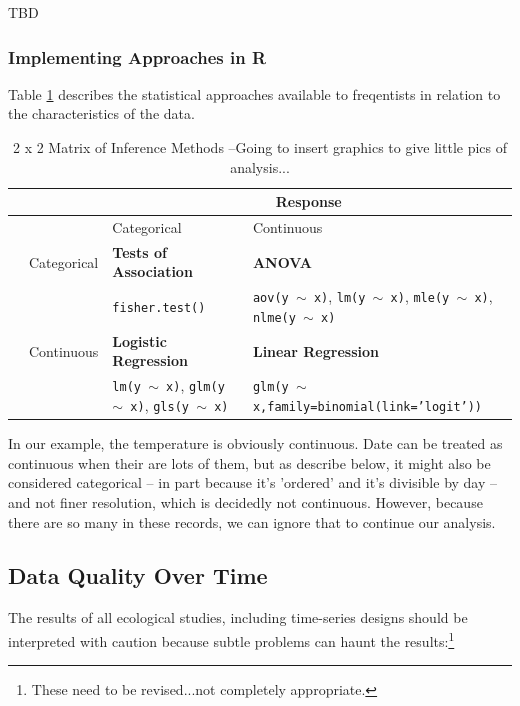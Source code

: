 \documentclass{article}\usepackage[]{graphicx}\usepackage[]{color}
\begin{document}
TBD

\subsubsection{Implementing Approaches in R}

Table \ref{tab:2X2Matrix} describes the statistical approaches available to freqentists in relation to the characteristics of the data. 

\begin{table}
	\caption{2 x 2 Matrix of Inference Methods  --Going to insert graphics to give little pics of analysis...}
	\label{tab:2X2Matrix}
	
		\begin{tabular}{|l|l||p{4cm}p{5cm}|} \hline
				&	& \multicolumn{2}{c|}{Response}    \\ \hline
				&			& Categorical 		& Continuous \\ \hline\hline
				
	\parbox[t]{2mm}{} & Categorical 		& \textbf{Tests of Association}	& \textbf{ANOVA} 						\\ 
	&& \texttt{fisher.test()} & \texttt{aov(y $\sim$ x)}, \texttt{lm(y $\sim$ x)}, \texttt{mle(y $\sim$ x)}, \texttt{nlme(y $\sim$ x)}\\
			& Continuous				&	\textbf{Logistic Regression}		& \textbf{Linear Regression}	\\ 
	&& \texttt{lm(y $\sim$ x)}, \texttt{glm(y $\sim$ x)}, \texttt{gls(y $\sim$ x)} & \texttt{glm(y $\sim$ x,family=binomial(link='logit'))}\\ \hline
		\end{tabular}

\end{table}

In our example, the temperature is obviously continuous. Date can be treated as continuous when their are lots of them, but as describe below, it might also be considered categorical -- in part because it's 'ordered' and it's divisible by day -- and not finer resolution, which is decidedly not continuous. However, because there are so many in these records, we can ignore that to continue our analysis. 

\subsection{Data Quality Over Time}

The results of all ecological studies, including time-series designs should be interpreted with caution because subtle problems can haunt the results:\footnote{These need to be revised...not completely appropriate.}
\end{document}
